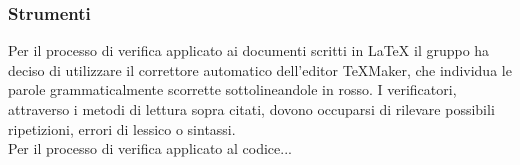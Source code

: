 \subsubsection{Strumenti}
Per il processo di verifica applicato ai documenti scritti in \LaTeX{} il gruppo ha deciso di utilizzare il correttore automatico dell'editor TeXMaker, che individua le parole grammaticalmente scorrette sottolineandole in rosso. I verificatori, attraverso i metodi di lettura sopra citati, dovono occuparsi di rilevare possibili ripetizioni, errori di lessico o sintassi.  \\
\linebreak
Per il processo di verifica applicato al codice...
















